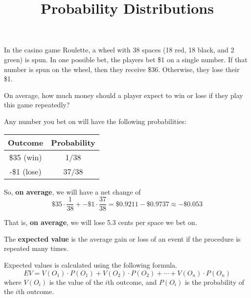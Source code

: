 \documentclass{beamer}
\title[MA205 - Section 5.1]{Probability Distributions}
\begin{document}
\begin{frame}
\titlepage
\end{frame}

\begin{frame}
\begin{example}
In the casino game Roulette, a wheel with 38 spaces (18 red, 18 black, and 2 green) is spun. In one possible bet, the players bet \$1 on a single number. If that number is spun on the wheel, then they receive \$36. Otherwise, they lose their \$1.

\vspace{2mm}
On average, how much money should a player expect to win or lose if they play this game repeatedly?\pause

\vspace{2mm}
Any number you bet on will have the following probabilities:
\begin{center}
\begin{tabular}{|c|c|} \hline
Outcome & Probability \\ \hline
\$35 (win) & 1/38 \\\hline
-\$1 (lose) & 37/38 \\ \hline
\end{tabular}
\end{center}\pause

So, \textbf{on average}, we will have a net change of
\begin{equation*}
\$35\cdot\dfrac{1}{38} + -\$1\cdot\dfrac{37}{38} = \$0.9211 - \$0.9737 \approx -\$0.053
\end{equation*}

That is, \textbf{on average}, we will lose 5.3 cents per space we bet on.
\end{example}
\end{frame}

\begin{frame}
\begin{definition}
The \textbf{expected value} is the average gain or loss of an event if the procedure is repeated many times.

\vspace{2mm}
Expected values is calculated using the following formula.
\begin{equation*}
EV = V(O_1)\cdot P(O_1)+V(O_2)\cdot P(O_2)+\cdots+V(O_n)\cdot P(O_n)
\end{equation*}
where $V(O_i)$ is the value of the $i$th outcome, and $P(O_i)$ is the probability of the $i$th outcome.\end{definition}
\end{frame}
\end{document}
